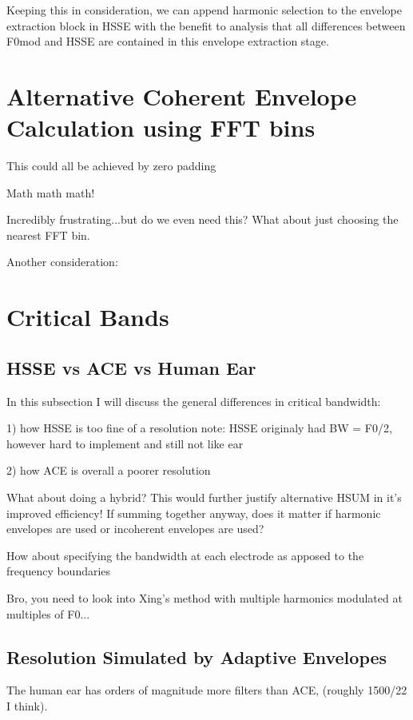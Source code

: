 \documentclass [11pt, proquest] {uwthesis}[2015/03/03]
\begin{document}
Keeping this in consideration, we can append harmonic selection to the envelope extraction block in HSSE with the benefit to analysis that all differences between F0mod and HSSE are contained in this envelope extraction stage.


\section{Alternative Coherent Envelope Calculation using FFT bins}

This could all be achieved by zero padding

Math math math!

Incredibly frustrating...but do we even need this?  What about just choosing the nearest FFT bin.

Another consideration: 

\section{Critical Bands}

\subsection{HSSE vs ACE vs Human Ear}

In this subsection I will discuss the general differences in critical bandwidth:

1) how HSSE is too fine of a resolution
note: HSSE originaly had BW = F0/2, however hard to implement and still not like ear

2) how ACE is overall a poorer resolution

What about doing a hybrid?  This would further justify alternative HSUM in it's improved efficiency!  If summing together anyway, does it matter if harmonic envelopes are used or incoherent envelopes are used?

How about specifying the bandwidth at each electrode as apposed to the frequency boundaries

Bro, you need to look into Xing's method with multiple harmonics modulated at multiples of F0...


\subsection{Resolution Simulated by Adaptive Envelopes}

The human ear has orders of magnitude more filters than ACE, (roughly 1500/22 I think).
\end{document}

